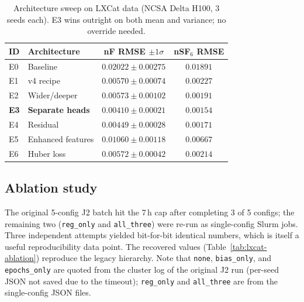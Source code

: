 \documentclass[11pt,a4paper]{article}
\begin{document}
\begin{table}[H]
  \centering
  \caption{Architecture sweep on LXCat data (NCSA Delta H100, 3 seeds
           each).  E3 wins outright on both mean and variance; no
           override needed.}
  \label{tab:lxcat-archsweep}
  \small
  \begin{tabular}{l l c c}
    \toprule
    ID & Architecture & nF RMSE $\pm 1\sigma$ & nSF$_6$ RMSE \\
    \midrule
    E0 & Baseline                  & $0.02022 \pm 0.00275$ & $0.01891$ \\
    E1 & v4 recipe                 & $0.00570 \pm 0.00074$ & $0.00227$ \\
    E2 & Wider/deeper              & $0.00573 \pm 0.00102$ & $0.00191$ \\
    \textbf{E3} & \textbf{Separate heads} & $\mathbf{0.00410 \pm 0.00021}$ & $\mathbf{0.00154}$ \\
    E4 & Residual                  & $0.00449 \pm 0.00028$ & $0.00171$ \\
    E5 & Enhanced features         & $0.01060 \pm 0.00118$ & $0.00667$ \\
    E6 & Huber loss                & $0.00572 \pm 0.00042$ & $0.00214$ \\
    \bottomrule
  \end{tabular}
\end{table}

\subsection{Ablation study}
The original 5-config J2 batch hit the 7\,h cap after completing
3 of 5 configs; the remaining two (\texttt{reg\_only} and
\texttt{all\_three}) were re-run as single-config Slurm jobs.
Three independent attempts yielded bit-for-bit identical numbers,
which is itself a useful reproducibility data point.  The
recovered values (Table~\ref{tab:lxcat-ablation}) reproduce the
legacy hierarchy.  Note that \texttt{none}, \texttt{bias\_only},
and \texttt{epochs\_only} are quoted from the cluster log of
the original J2 run (per-seed JSON not saved due to the timeout);
\texttt{reg\_only} and \texttt{all\_three} are from the
single-config JSON files.
\end{document}
